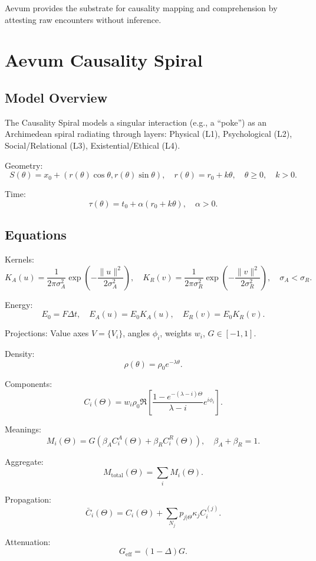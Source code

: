 \documentclass[11pt,a4paper]{article}
\theoremstyle{plain}
\begin{document}
Aevum provides the substrate for causality mapping and comprehension by attesting raw encounters without inference.

\section{Aevum Causality Spiral}

\subsection{Model Overview}

The Causality Spiral models a singular interaction (e.g., a ``poke'') as an Archimedean spiral radiating through layers: Physical (L1), Psychological (L2), Social/Relational (L3), Existential/Ethical (L4).

Geometry:
\[
S(\theta) = x_0 + (r(\theta)\cos\theta, r(\theta)\sin\theta), \quad r(\theta) = r_0 + k\theta, \quad \theta \geq 0, \quad k > 0.
\]

Time:
\[
\tau(\theta) = t_0 + \alpha(r_0 + k\theta), \quad \alpha > 0.
\]

\subsection{Equations}

Kernels:
\[
K_A(u) = \frac{1}{2\pi\sigma_A^2} \exp\left(-\frac{\|u\|^2}{2\sigma_A^2}\right), \quad
K_R(v) = \frac{1}{2\pi\sigma_R^2} \exp\left(-\frac{\|v\|^2}{2\sigma_R^2}\right), \quad \sigma_A < \sigma_R.
\]

Energy:
\[
E_0 = F \Delta t, \quad E_A(u) = E_0 K_A(u), \quad E_R(v) = E_0 K_R(v).
\]

Projections: Value axes $V = \{V_i\}$, angles $\phi_i$, weights $w_i$, $G \in [-1,1]$.

Density:
\[
\rho(\theta) = \rho_0 e^{-\lambda\theta}.
\]

Components:
\[
C_i(\Theta) = w_i \rho_0 \Re \left[ \frac{1 - e^{-(\lambda - i)\Theta}}{\lambda - i} e^{i\phi_i} \right].
\]

Meanings:
\[
M_i(\Theta) = G \left( \beta_A C_i^A(\Theta) + \beta_R C_i^R(\Theta) \right), \quad \beta_A + \beta_R = 1.
\]

Aggregate:
\[
M_{\mathrm{total}}(\Theta) = \sum_i M_i(\Theta).
\]

Propagation:
\[
\bar{C}_i(\Theta) = C_i(\Theta) + \sum_{N_j} p_{j|\Theta} \kappa_j C_i^{(j)}.
\]

Attenuation:
\[
G_{\mathrm{eff}} = (1 - \Delta) G.
\]
\end{document}
